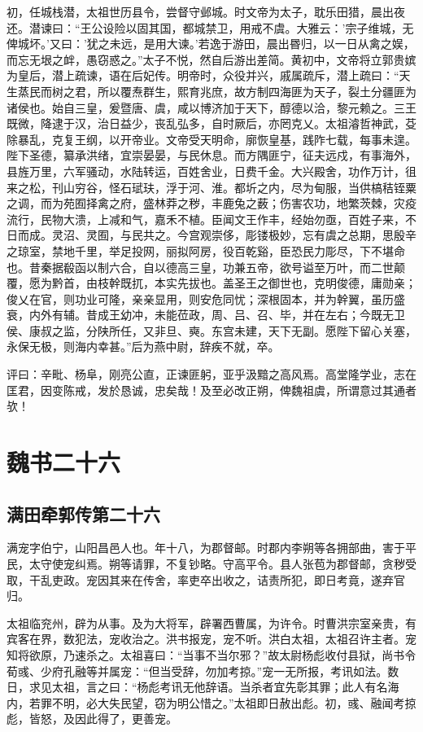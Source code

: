 \documentclass[12pt,UTF8]{ctexbook}
\begin{document}
初，任城栈潜，太祖世历县令，尝督守邺城。时文帝为太子，耽乐田猎，晨出夜还。潜谏曰：“王公设险以固其国，都城禁卫，用戒不虞。大雅云：'宗子维城，无俾城坏。'又曰：'犹之未远，是用大谏。'若逸于游田，晨出昬归，以一日从禽之娱，而忘无垠之衅，愚窃惑之。”太子不悦，然自后游出差简。黄初中，文帝将立郭贵嫔为皇后，潜上疏谏，语在后妃传。明帝时，众役并兴，戚属疏斥，潜上疏曰：“天生蒸民而树之君，所以覆焘群生，熙育兆庶，故方制四海匪为天子，裂土分疆匪为诸侯也。始自三皇，爰暨唐、虞，咸以博济加于天下，醇德以洽，黎元赖之。三王既微，降逮于汉，治日益少，丧乱弘多，自时厥后，亦罔克乂。太祖濬哲神武，芟除暴乱，克复王纲，以开帝业。文帝受天明命，廓恢皇基，践阼七载，每事未遑。陛下圣德，纂承洪绪，宜崇晏晏，与民休息。而方隅匪宁，征夫远戍，有事海外，县旌万里，六军骚动，水陆转运，百姓舍业，日费千金。大兴殿舍，功作万计，徂来之松，刊山穷谷，怪石珷玞，浮于河、淮。都圻之内，尽为甸服，当供槁秸铚粟之调，而为苑囿择禽之府，盛林莽之秽，丰鹿兔之薮；伤害农功，地繁茨棘，灾疫流行，民物大溃，上减和气，嘉禾不植。臣闻文王作丰，经始勿亟，百姓子来，不日而成。灵沼、灵囿，与民共之。今宫观崇侈，彫镂极妙，忘有虞之总期，思殷辛之琼室，禁地千里，举足投网，丽拟阿房，役百乾谿，臣恐民力彫尽，下不堪命也。昔秦据殽函以制六合，自以德高三皇，功兼五帝，欲号谥至万叶，而二世颠覆，愿为黔首，由枝幹既扤，本实先拔也。盖圣王之御世也，克明俊德，庸勋亲；俊乂在官，则功业可隆，亲亲显用，则安危同忧；深根固本，并为幹翼，虽历盛衰，内外有辅。昔成王幼冲，未能莅政，周、吕、召、毕，并在左右；今既无卫侯、康叔之监，分陕所任，又非旦、奭。东宫未建，天下无副。愿陛下留心关塞，永保无极，则海内幸甚。”后为燕中尉，辞疾不就，卒。

评曰：辛毗、杨阜，刚亮公直，正谏匪躬，亚乎汲黯之高风焉。高堂隆学业，志在匡君，因变陈戒，发於恳诚，忠矣哉！及至必改正朔，俾魏祖虞，所谓意过其通者欤！

\part{魏书二十六}
\chapter{满田牵郭传第二十六}

满宠字伯宁，山阳昌邑人也。年十八，为郡督邮。时郡内李朔等各拥部曲，害于平民，太守使宠纠焉。朔等请罪，不复钞略。守高平令。县人张苞为郡督邮，贪秽受取，干乱吏政。宠因其来在传舍，率吏卒出收之，诘责所犯，即日考竟，遂弃官归。

太祖临兖州，辟为从事。及为大将军，辟署西曹属，为许令。时曹洪宗室亲贵，有宾客在界，数犯法，宠收治之。洪书报宠，宠不听。洪白太祖，太祖召许主者。宠知将欲原，乃速杀之。太祖喜曰：“当事不当尔邪？”故太尉杨彪收付县狱，尚书令荀彧、少府孔融等并属宠：“但当受辞，勿加考掠。”宠一无所报，考讯如法。数日，求见太祖，言之曰：“杨彪考讯无他辞语。当杀者宜先彰其罪；此人有名海内，若罪不明，必大失民望，窃为明公惜之。”太祖即日赦出彪。初，彧、融闻考掠彪，皆怒，及因此得了，更善宠。
\end{document}
